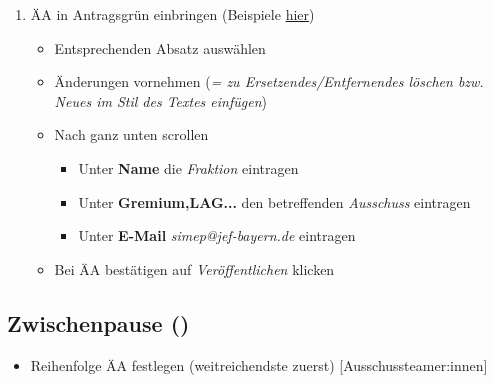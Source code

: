 \documentclass{article}
\begin{document}
\begin{enumerate}
\begin{enumerate}
            \item ÄA in Antragsgrün einbringen (Beispiele \href{https://drive.google.com/drive/folders/14sA-kBBqEivc-man3TKYYKYBKKZzBpAR}{hier})
            \begin{itemize}
            		\item Entsprechenden Absatz auswählen
            		\item Änderungen vornehmen (\textit{= zu Ersetzendes/Entfernendes löschen bzw. Neues im Stil des Textes einfügen})
            		\item Nach ganz unten scrollen
            		\begin{itemize}
					\item Unter \textbf{Name} die \textit{Fraktion} eintragen
            			\item Unter \textbf{Gremium,LAG...} den betreffenden \textit{Ausschuss} eintragen
            			\item Unter \textbf{E-Mail} \textit{simep@jef-bayern.de} eintragen
            		\end{itemize}
            		\item Bei ÄA bestätigen auf \textit{Veröffentlichen} klicken
            \end{itemize}
		\end{enumerate} 
	\end{enumerate}
	
	\subsection{Zwischenpause (\timePauseOne)}
	\begin{itemize}
		\item Reihenfolge ÄA festlegen (weitreichendste zuerst) [Ausschussteamer:innen]
	\end{itemize}
	
\end{document}
